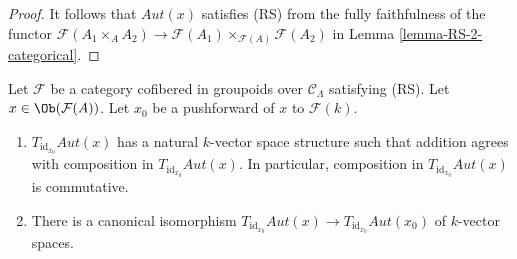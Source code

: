 \begin{proof}
It follows that $\mathit{Aut}(x)$ satisfies (RS) from the fully
faithfulness of the functor
$\mathcal{F}(A_1 \times_A A_2) \to
\mathcal{F}(A_1) \times_{\mathcal{F}(A)} \mathcal{F}(A_2)$ in
Lemma \ref{lemma-RS-2-categorical}.
\end{proof}

\begin{lemma}
\label{lemma-Aut-functor-tangent-space}
Let $\mathcal{F}$ be a category cofibered in groupoids over
$\mathcal{C}_\Lambda$ satisfying (RS). Let
$x \in \Ob(\mathcal{F}(A))$. Let $x_0$ be a pushforward of $x$ to
$\mathcal{F}(k)$.
\begin{enumerate}
\item $T_{\text{id}_{x_0}} \mathit{Aut}(x)$ has a natural $k$-vector
space structure such that addition agrees with composition in
$T_{\text{id}_{x_0}} \mathit{Aut}(x)$. In particular, composition in
$T_{\text{id}_{x_0}} \mathit{Aut}(x)$ is commutative.
\item There is a canonical isomorphism
$T_{\text{id}_{x_0}} \mathit{Aut}(x) \to
T_{\text{id}_{x_0}} \mathit{Aut}(x_0)$
of $k$-vector spaces.
\end{enumerate}
\end{lemma}

